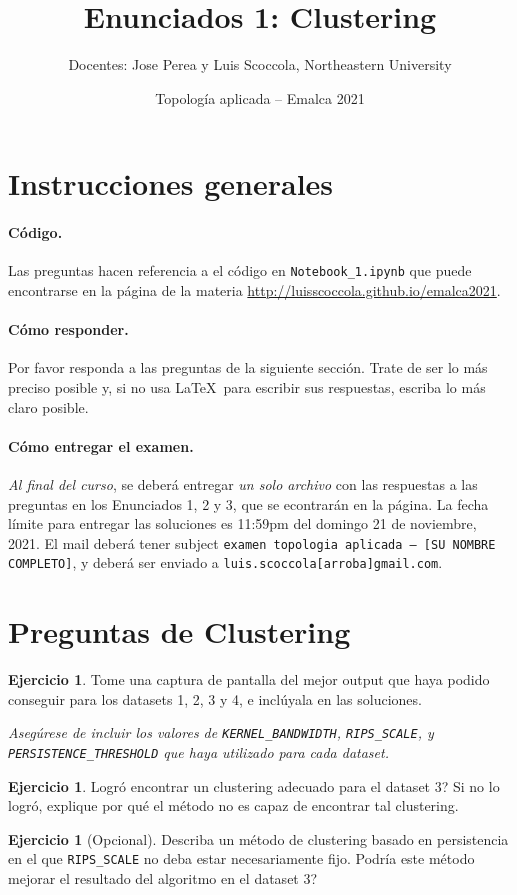 \documentclass[12pt,reqno,oneside]{article}
\title{Enunciados 1: Clustering}
\date{Topolog\'{i}a aplicada -- Emalca 2021 }
\author{Docentes: Jose Perea y Luis Scoccola, Northeastern University}
\DeclareRobustCommand\squelch[1]{%
    \BeginAccSupp{method=plain,ActualText={}}#1\EndAccSupp{}}
\theoremstyle{definition}
\newtheorem{pregunta}[theorem]{Ejercicio}
\begin{document}
\maketitle

\section{Instrucciones generales}
%
\paragraph{C\'odigo.}
Las preguntas hacen referencia a el c\'odigo en \texttt{Notebook\_1.ipynb} que puede encontrarse en la p\'agina de la materia
\url{http://luisscoccola.github.io/emalca2021}.

\paragraph{C\'omo responder.}
Por favor responda a las preguntas de la siguiente secci\'on. 
Trate de ser lo m\'as preciso posible y, si no usa \LaTeX~para escribir sus respuestas, escriba lo m\'as claro posible.

\paragraph{C\'omo entregar el examen.}
\textit{Al final del curso}, se deber\'a entregar \textit{un solo archivo} con las respuestas a las preguntas en los Enunciados 1, 2 y 3, que se econtrar\'an en la p\'agina.
La fecha l\'imite para entregar las soluciones es 11:59pm del domingo 21 de noviembre, 2021.
El mail deber\'a tener subject \texttt{examen topologia aplicada -- [SU NOMBRE COMPLETO]}, y deber\'a ser enviado a \squelch{\texttt{luis.scoccola[arroba]gmail.com}}.

\section{Preguntas de Clustering}
\begin{pregunta}
	Tome una captura de pantalla del mejor output que haya podido conseguir para los datasets 1, 2, 3 y 4, e incl\'uyala en las soluciones.

	\noindent
	\textit{Aseg\'urese de incluir los valores de \texttt{KERNEL\_BANDWIDTH}, \texttt{RIPS\_SCALE}, y \texttt{PERSISTENCE\_THRESHOLD} que haya utilizado para cada dataset.}
\end{pregunta}

\begin{pregunta}
	Logr\'o encontrar un clustering adecuado para el dataset 3?
	Si no lo logr\'o, explique por qu\'e el m\'etodo no es capaz de encontrar tal clustering.
\end{pregunta}

\begin{pregunta}[Opcional]
	Describa un m\'etodo de clustering basado en persistencia en el que \texttt{RIPS\_SCALE} no deba estar necesariamente fijo.
	Podr\'ia este m\'etodo mejorar el resultado del algoritmo en el dataset 3?
\end{pregunta}
\end{document}
